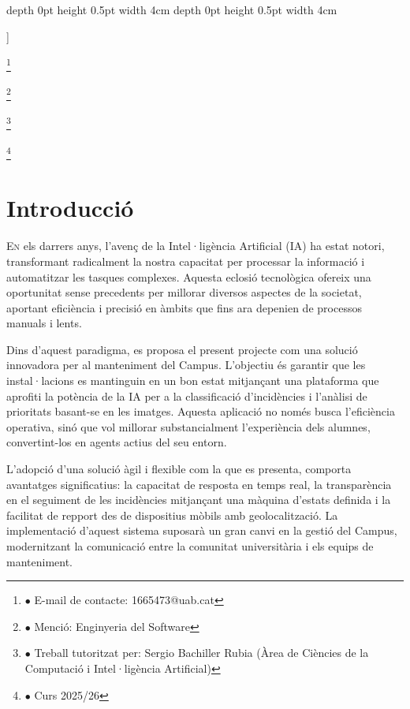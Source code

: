 \documentclass[10pt,a4paper,twocolumn,twoside]{article}
\newcommand\blfootnote[1]{%
	\begingroup
	\renewcommand\thefootnote{}\footnote{#1}%
	\addtocounter{footnote}{-1}%
	\endgroup
}
\begin{document}
\begin{@twocolumnfalse}
\begin{center}
				\bigskip
				
				{\vrule depth 0pt height 0.5pt width 4cm\hspace{7.5pt}%
					\hspace{7.5pt}\vrule depth 0pt height 0.5pt width 4cm\relax}
				
			\end{center}
			
			\bigskip
		\end{@twocolumnfalse}]
		
		\blfootnote{$\bullet$ E-mail de contacte: 1665473@uab.cat}
		\blfootnote{$\bullet$ Menció: Enginyeria del Software}
		\blfootnote{$\bullet$ Treball tutoritzat per: Sergio Bachiller Rubia (Àrea de Ciències de la Computació i Intel·ligència Artificial)}
		\blfootnote{$\bullet$ Curs 2025/26}
		
		\section{Introducció}
		
		\lettrine[lines=3]{E}{n} els darrers anys, l'avenç de la Intel·ligència Artificial (IA) ha estat notori, transformant radicalment la nostra capacitat per processar la informació i automatitzar les tasques complexes. Aquesta eclosió tecnològica ofereix una oportunitat sense precedents per millorar diversos aspectes de la societat, aportant eficiència i precisió en àmbits que fins ara depenien de processos manuals i lents.
		
		Dins d'aquest paradigma, es proposa el present projecte com una solució innovadora per al manteniment del Campus. L'objectiu és garantir que les instal·lacions es mantinguin en un bon estat mitjançant una plataforma que aprofiti la potència de la IA per a la classificació d'incidències i l'anàlisi de prioritats basant-se en les imatges. Aquesta aplicació no només busca l'eficiència operativa, sinó que vol millorar substancialment l'experiència dels alumnes, convertint-los en agents actius del seu entorn.
		
		L'adopció d'una solució àgil i flexible com la que es presenta, comporta avantatges significatius: la capacitat de resposta en temps real, la transparència en el seguiment de les incidències mitjançant una màquina d'estats definida i la facilitat de repport des de dispositius mòbils amb geolocalització. La implementació d'aquest sistema suposarà un gran canvi en la gestió del Campus, modernitzant la comunicació entre la comunitat universitària i els equips de manteniment.
		
\end{document}
